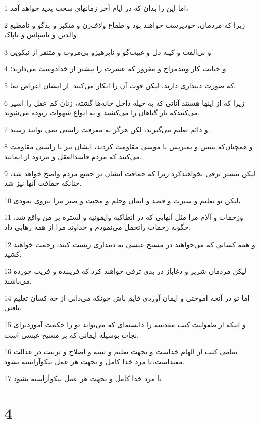 \par 1 اما این را بدان که در ایام آخر زمانهای سخت پدید خواهد آمد،
\par 2 زیرا که مردمان، خودپرست خواهند بود و طماع ولاف‌زن و متکبر و بدگو و نامطیع والدین و ناسپاس و ناپاک
\par 3 و بی‌الفت و کینه دل و غیبت‌گو و ناپرهیزو بی‌مروت و متنفر از نیکویی
\par 4 و خیانت کار وتندمزاج و مغرور که عشرت را بیشتر از خدادوست می‌دارند؛
\par 5 که صورت دینداری دارند، لیکن قوت آن را انکار می‌کنند. از ایشان اعراض نما.
\par 6 زیرا که از اینها هستند آنانی که به حیله داخل خانه‌ها گشته، زنان کم عقل را اسیر می‌کنندکه بار گناهان را می‌کشند و به انواع شهوات ربوده می‌شوند.
\par 7 و دائم تعلیم می‌گیرند، لکن هرگز به معرفت راستی نمی توانند رسید.
\par 8 و همچنان‌که ینیس و یمبریس با موسی مقاومت کردند، ایشان نیز با راستی مقاومت می‌کنند که مردم فاسدالعقل و مردود از ایمانند.
\par 9 لیکن بیشتر ترقی نخواهندکرد زیرا که حماقت ایشان بر جمیع مردم واضح خواهد شد، چنانکه حماقت آنها نیز شد.
\par 10 لیکن تو تعلیم و سیرت و قصد و ایمان وحلم و محبت و صبر مرا پیروی نمودی،
\par 11 وزحمات و آلام مرا مثل آنهایی که در انطاکیه وایقونیه و لستره بر من واقع شد، چگونه زحمات راتحمل می‌نمودم و خداوند مرا از همه رهایی داد.
\par 12 و همه کسانی که می‌خواهند در مسیح عیسی به دینداری زیست کنند، زحمت خواهند کشید.
\par 13 لیکن مردمان شریر و دغاباز در بدی ترقی خواهند کرد که فریبنده و فریب خورده می‌باشند.
\par 14 اما تو در آنچه آموختی و ایمان آوردی قایم باش چونکه می‌دانی از چه کسان تعلیم یافتی،
\par 15 و اینکه از طفولیت کتب مقدسه را دانسته‌ای که می‌تواند تو را حکمت آموزدبرای نجات بوسیله ایمانی که بر مسیح عیسی است.
\par 16 تمامی کتب از الهام خداست و بجهت تعلیم و تنبیه و اصلاح و تربیت در عدالت مفیداست،تا مرد خدا کامل و بجهت هر عمل نیکوآراسته بشود.
\par 17 تا مرد خدا کامل و بجهت هر عمل نیکوآراسته بشود.

\chapter{4}

